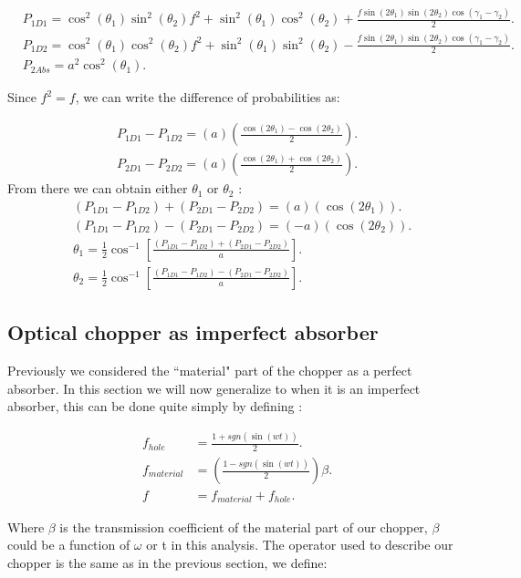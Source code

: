 \documentclass[12pt]{article}
\begin{document}
\begin{align}
& P_{1D1}=\cos^2(\theta_{1})\sin^2(\theta_{2})f^2+ \sin^2(\theta_{1})\cos^2(\theta_{2})+\frac{f \sin(2\theta_{1})\sin(2\theta_{2})\cos(\gamma_{1}-\gamma_{2})}{2}.\\
& P_{1D2}=\cos^2(\theta_{1})\cos^2(\theta_{2})f^2+ \sin^2(\theta_{1})\sin^2(\theta_{2})-\frac{f \sin(2\theta_{1})\sin(2\theta_{2})\cos(\gamma_{1}-\gamma_{2})}{2}.\\
& P_{2Abs}=a^2 \cos^2(\theta_{1}).
\end{align}

Since $f^2=f$, we can write the difference of probabilities as:

\begin{align}
P_{1D1}-P_{1D2}=(a)\left(\frac{\cos(2 \theta_{1})-\cos(2 \theta_{2})}{2}\right).\\
P_{2D1}-P_{2D2}=(a)\left(\frac{\cos(2 \theta_{1})+\cos(2 \theta_{2})}{2}\right).
\end{align}
 From there we can obtain either $\theta_{1}$  or $\theta_{2}$ :
\begin{align}
&(P_{1D1}-P_{1D2})+(P_{2D1}-P_{2D2})=(a)(\cos(2 \theta_{1})).\\
&(P_{1D1}-P_{1D2})-(P_{2D1}-P_{2D2})=(-a)(\cos(2 \theta_{2})).\\
 &\theta_{1}=\frac{1}{2}\cos^{-1}\left[\frac{(P_{1D1}-P_{1D2})+(P_{2D1}-P_{2D2})}{a}\right].\\
 &\theta_{2}=\frac{1}{2}\cos^{-1}\left[\frac{(P_{1D1}-P_{1D2})-(P_{2D1}-P_{2D2})}{a}\right].
 \end{align}
 
\pagebreak

\subsection{Optical chopper as imperfect absorber}

Previously we considered the ``material" part of the chopper as a perfect absorber. In this section we will now generalize to when it is an imperfect absorber, this can be done quite simply by defining :
 

\begin{align} 
f_{hole}&=\frac{1+sgn(\sin(wt))}{2}.\\
f_{material}&=\left(\frac{1-sgn(\sin(wt))}{2} \right)\beta.\\
f&=f_{material}+f_{hole}.
\end{align}


Where $\beta$ is the transmission coefficient of the material part of our chopper, $\beta$ could be a function of  $\omega$ or t in this analysis. The operator used to describe our chopper is the same as in the previous section, we define:
\end{document}
